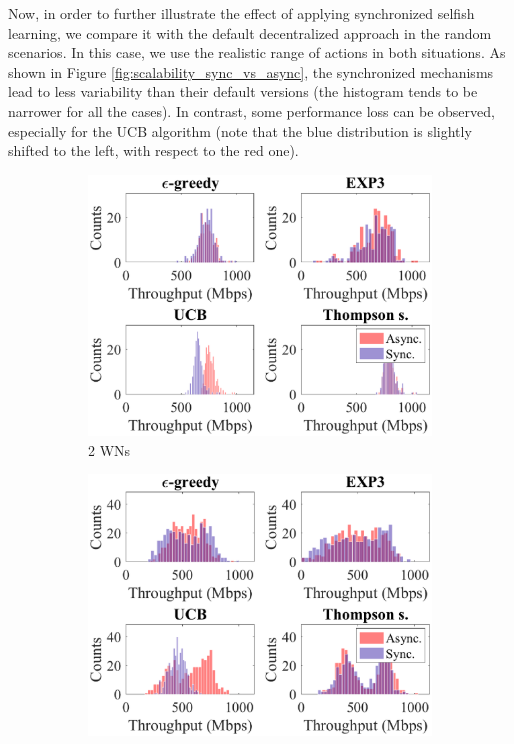\documentclass[preprint,12pt]{article}
\begin{document}
Now, in order to further illustrate the effect of applying synchronized selfish learning, we compare it with the default decentralized approach in the random scenarios. In this case, we use the realistic range of actions in both situations. As shown in Figure \ref{fig:scalability_sync_vs_async}, the synchronized mechanisms lead to less variability than their default versions (the histogram tends to be narrower for all the cases). In contrast, some performance loss can be observed, especially for the UCB algorithm (note that the blue distribution is slightly shifted to the left, with respect to the red one). 

\begin{figure}[h!]
	\centering
	\begin{subfigure}[b]{.4\textwidth}
		\includegraphics[width=\textwidth]{images/hist_mean_tpt_2_WNs}
		\caption{2 WNs}\label{fig:hist_mean_tpt_2_WNs}
	\end{subfigure}
	\begin{subfigure}[b]{.4\textwidth}
		\includegraphics[width=\textwidth]{images/hist_mean_tpt_4_WNs}

\end{subfigure}
\end{figure}
\end{document}
